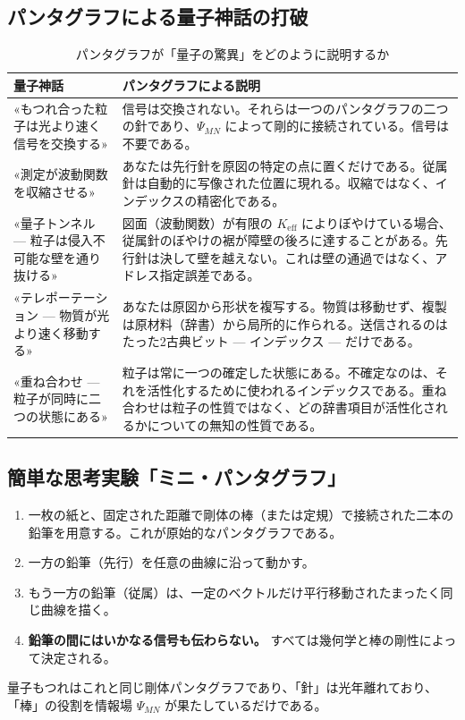 \documentclass[12pt,a4paper]{article}
\begin{document}
	\subsection{パンタグラフによる量子神話の打破}
	
	\begin{table}[htbp]
		\centering
		\caption{パンタグラフが「量子の驚異」をどのように説明するか}
		\label{tab:myths}
		\begin{tabular}{|p{4.5cm}|p{9cm}|}
			\hline
			\textbf{量子神話} & \textbf{パンタグラフによる説明} \\
			\hline
			«もつれ合った粒子は光より速く信号を交換する» & 信号は交換されない。それらは一つのパンタグラフの二つの針であり、\(\Psi_{MN}\) によって剛的に接続されている。信号は不要である。 \\
			\hline
			«測定が波動関数を収縮させる» & あなたは先行針を原図の特定の点に置くだけである。従属針は自動的に写像された位置に現れる。収縮ではなく、インデックスの精密化である。 \\
			\hline
			«量子トンネル — 粒子は侵入不可能な壁を通り抜ける» & 図面（波動関数）が有限の \(K_{\mathrm{eff}}\) によりぼやけている場合、従属針のぼやけの裾が障壁の後ろに達することがある。先行針は決して壁を越えない。これは壁の通過ではなく、アドレス指定誤差である。 \\
			\hline
			«テレポーテーション — 物質が光より速く移動する» & あなたは原図から形状を複写する。物質は移動せず、複製は原材料（辞書）から局所的に作られる。送信されるのはたった2古典ビット — インデックス — だけである。 \\
			\hline
			«重ね合わせ — 粒子が同時に二つの状態にある» & 粒子は常に一つの確定した状態にある。不確定なのは、それを活性化するために使われるインデックスである。重ね合わせは粒子の性質ではなく、どの辞書項目が活性化されるかについての無知の性質である。 \\
			\hline
		\end{tabular}
	\end{table}
	
	\subsection{簡単な思考実験「ミニ・パンタグラフ」}
	
	\begin{enumerate}
		\item 一枚の紙と、固定された距離で剛体の棒（または定規）で接続された二本の鉛筆を用意する。これが原始的なパンタグラフである。
		\item 一方の鉛筆（先行）を任意の曲線に沿って動かす。
		\item もう一方の鉛筆（従属）は、一定のベクトルだけ平行移動されたまったく同じ曲線を描く。
		\item \textbf{鉛筆の間にはいかなる信号も伝わらない。} すべては幾何学と棒の剛性によって決定される。
	\end{enumerate}
	量子もつれはこれと同じ剛体パンタグラフであり、「針」は光年離れており、「棒」の役割を情報場 \(\Psi_{MN}\) が果たしているだけである。
	
\end{document}
